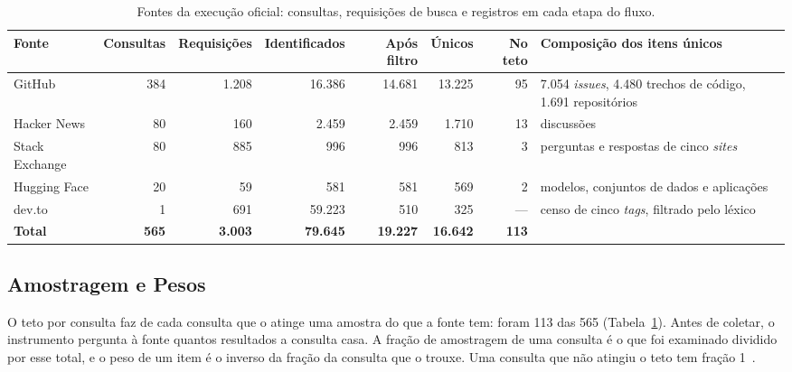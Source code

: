 \documentclass[sigconf]{acmart}
\newcommand{\ColConsultas}{565}          %
\newcommand{\ColAmostradas}{113}         %
\begin{document}
\begin{table}[tb]
\centering
\caption{Fontes da execução oficial: consultas, requisições de busca e registros em cada etapa do fluxo.}
\label{tab:coleta}
\footnotesize
\begin{tabular}{@{}lrrrrrrl@{}}
\toprule
\textbf{Fonte} & \textbf{Consultas} & \textbf{Requisições} & \textbf{Identificados} & \textbf{Após filtro} & \textbf{Únicos} & \textbf{No teto} & \textbf{Composição dos itens únicos} \\
\midrule
GitHub & 384 & 1.208 & 16.386 & 14.681 & 13.225 & 95 & 7.054 \textit{issues}, 4.480 trechos de código, 1.691 repositórios \\
Hacker News & 80 & 160 & 2.459 & 2.459 & 1.710 & 13 & discussões \\
Stack Exchange & 80 & 885 & 996 & 996 & 813 & 3 & perguntas e respostas de cinco \textit{sites} \\
Hugging Face & 20 & 59 & 581 & 581 & 569 & 2 & modelos, conjuntos de dados e aplicações \\
dev.to & 1 & 691 & 59.223 & 510 & 325 & --- & censo de cinco \textit{tags}, filtrado pelo léxico \\
\midrule
\textbf{Total} & \textbf{565} & \textbf{3.003} & \textbf{79.645} & \textbf{19.227} & \textbf{16.642} & \textbf{113} & \\
\bottomrule
\end{tabular}
\par{}
\end{table}

\subsection{Amostragem e Pesos}
\label{sec:met-amostragem}

O teto por consulta faz de cada consulta que o atinge uma amostra do que a fonte tem: foram \ColAmostradas{} das \ColConsultas{} (Tabela~\ref{tab:coleta}). Antes de coletar, o instrumento pergunta à fonte quantos resultados a consulta casa. A fração de amostragem de uma consulta é o que foi examinado dividido por esse total, e o peso de um item é o inverso da fração da consulta que o trouxe. Uma consulta que não atingiu o teto tem fração 1~\cite{msrkit2027}.
\end{document}
